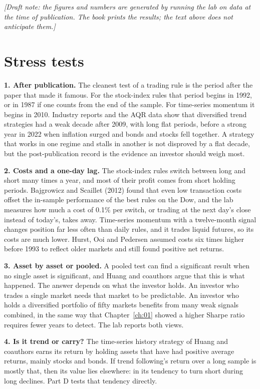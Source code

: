 \emph{[Draft note: the figures and numbers are generated by running the lab on data at the time of publication. The book prints the results; the text above does not anticipate them.]}

\section{Stress tests}
\label{sec:09-stress}

\textbf{1. After publication.} The cleanest test of a trading rule is the period after the paper that made it famous. For the stock-index rules that period begins in 1992, or in 1987 if one counts from the end of the sample. For time-series momentum it begins in 2010. Industry reports and the AQR data show that diversified trend strategies had a weak decade after 2009, with long flat periods, before a strong year in 2022 when inflation surged and bonds and stocks fell together. A strategy that works in one regime and stalls in another is not disproved by a flat decade, but the post-publication record is the evidence an investor should weigh most.

\textbf{2. Costs and a one-day lag.} The stock-index rules switch between long and short many times a year, and most of their profit comes from short holding periods. Bajgrowicz and Scaillet (2012) found that even low transaction costs offset the in-sample performance of the best rules on the Dow, and the lab measures how much a cost of 0.1\% per switch, or trading at the next day's close instead of today's, takes away. Time-series momentum with a twelve-month signal changes position far less often than daily rules, and it trades liquid futures, so its costs are much lower. Hurst, Ooi and Pedersen assumed costs six times higher before 1993 to reflect older markets and still found positive net returns.

\textbf{3. Asset by asset or pooled.} A pooled test can find a significant result when no single asset is significant, and Huang and coauthors argue that this is what happened. The answer depends on what the investor holds. An investor who trades a single market needs that market to be predictable. An investor who holds a diversified portfolio of fifty markets benefits from many weak signals combined, in the same way that Chapter~\ref{ch:01} showed a higher Sharpe ratio requires fewer years to detect. The lab reports both views.

\textbf{4. Is it trend or carry?} The time-series history strategy of Huang and coauthors earns its return by holding assets that have had positive average returns, mainly stocks and bonds. If trend following's return over a long sample is mostly that, then its value lies elsewhere: in its tendency to turn short during long declines. Part D tests that tendency directly.

